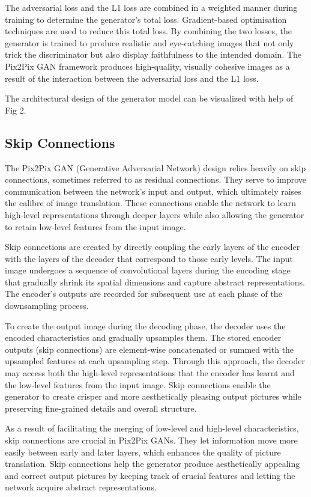 \documentclass{./styles/svproc}
\begin{document}
The adversarial loss and the L1 loss are combined in a weighted manner during training to determine the generator's total loss. Gradient-based optimisation techniques are used to reduce this total loss. By combining the two losses, the generator is trained to produce realistic and eye-catching images that not only trick the discriminator but also display faithfulness to the intended domain. The Pix2Pix GAN framework produces high-quality, visually cohesive images as a result of the interaction between the adversarial loss and the L1 loss.

The architectural design of the generator model can be visualized with help of Fig 2.

\subsection{Skip Connections}

The Pix2Pix GAN (Generative Adversarial Network) design relies heavily on skip connections, sometimes referred to as residual connections. They serve to improve communication between the network's input and output, which ultimately raises the calibre of image translation. These connections enable the network to learn high-level representations through deeper layers while also allowing the generator to retain low-level features from the input image.

Skip connections are created by directly coupling the early layers of the encoder with the layers of the decoder that correspond to those early levels. The input image undergoes a sequence of convolutional layers during the encoding stage that gradually shrink its spatial dimensions and capture abstract representations. The encoder's outputs are recorded for subsequent use at each phase of the downsampling process.

To create the output image during the decoding phase, the decoder uses the encoded characteristics and gradually upsamples them. The stored encoder outputs (skip connections) are element-wise concatenated or summed with the upsampled features at each upsampling step. Through this approach, the decoder may access both the high-level representations that the encoder has learnt and the low-level features from the input image. Skip connections enable the generator to create crisper and more aesthetically pleasing output pictures while preserving fine-grained details and overall structure.

As a result of facilitating the merging of low-level and high-level characteristics, skip connections are crucial in Pix2Pix GANs. They let information move more easily between early and later layers, which enhances the quality of picture translation. Skip connections help the generator produce aesthetically appealing and correct output pictures by keeping track of crucial features and letting the network acquire abstract representations.
\end{document}
